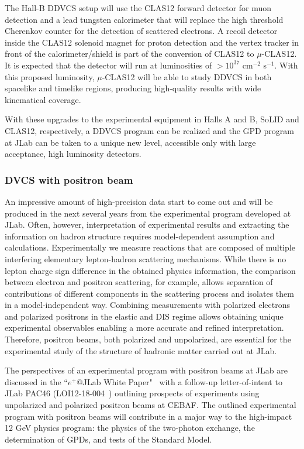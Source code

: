The Hall-B DDVCS setup will use the CLAS12 forward detector for muon detection and a lead tungsten calorimeter that will replace the high threshold Cherenkov counter for the detection of scattered electrons. A recoil detector inside the CLAS12 solenoid magnet for proton detection and the vertex tracker in front of the calorimeter/shield is part of the conversion of CLAS12 to $\mu$-CLAS12. It is expected that the detector will run at luminosities of $> 10^{37}$ cm$^{-2}$ s$^{-1}$. With this proposed luminosity, $\mu$-CLAS12 will be able to study DDVCS in both spacelike and timelike regions, producing high-quality results with wide kinematical coverage. 

With these upgrades to the experimental equipment in Halls A and B, SoLID and CLAS12, respectively, a DDVCS program can be realized and the GPD program at JLab can be taken to a unique new level, accessible only with large acceptance, high luminosity detectors.

\subsubsection*{DVCS with positron beam} 

An impressive amount of high-precision data start to come out and will be produced in the next several years from the experimental program developed at JLab. 
Often, however, interpretation of experimental results and extracting the information on hadron structure requires model-dependent assumption and calculations. Experimentally we measure reactions that are composed of multiple interfering elementary lepton-hadron scattering mechanisms. 
While there is no lepton charge sign difference in the obtained physics information, the comparison between electron and positron scattering, for example, allows separation of contributions of different components in the scattering process and isolates them in a model-independent way. Combining measurements with polarized electrons and polarized positrons in the elastic and DIS regime allows obtaining unique experimental observables enabling a more accurate and refined interpretation. Therefore, positron beams, both polarized and unpolarized, are essential for the experimental study of the structure of hadronic matter carried out at JLab.


The perspectives of an experimental program with positron beams at JLab are discussed in the ``$e^+$@JLab White Paper"~\cite{Accardi:2020swt} with a follow-up letter-of-intent to JLab PAC46 (LOI12-18-004~\cite{LOI12-18-004}) outlining prospects of experiments using unpolarized and polarized positron beams at CEBAF. The outlined experimental program with positron beams will contribute in a major way to the high-impact 12 GeV physics program: the physics of the two-photon exchange, the determination of GPDs, and tests of the Standard Model.




